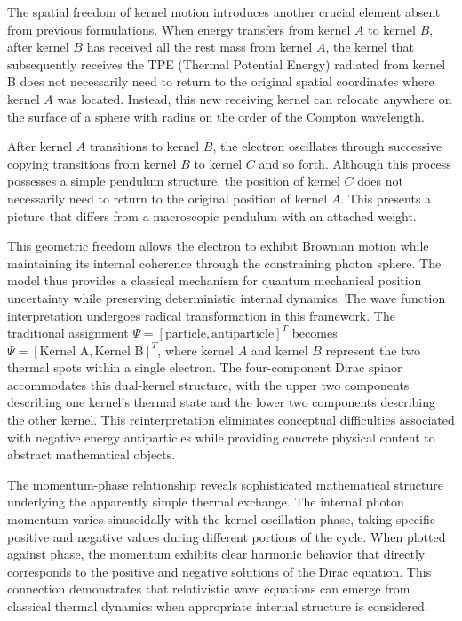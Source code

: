 \documentclass[%
 reprint,
 amsmath,amssymb,
 aps,
]{revtex4-1}
\numberwithin{equation}{section}%
\begin{document}
The spatial freedom of kernel motion introduces another crucial element absent from previous formulations. When energy transfers from kernel $A$ to kernel $B$, after kernel $B$ has received all the rest mass from kernel $A$, the kernel that subsequently receives the TPE (Thermal Potential Energy) radiated from kernel B does not necessarily need to return to the original spatial coordinates where kernel $A$ was located. Instead, this new receiving kernel can relocate anywhere on the surface of a sphere with radius on the order of the Compton wavelength. 

After kernel $A$ transitions to kernel $B$, the electron oscillates through successive copying transitions from kernel $B$ to kernel $C$ and so forth. Although this process possesses a simple pendulum structure, the position of kernel $C$ does not necessarily need to return to the original position of kernel $A$. This presents a picture that differs from a macroscopic pendulum with an attached weight.

This geometric freedom allows the electron to exhibit Brownian motion while maintaining its internal coherence through the constraining photon sphere. The model thus provides a classical mechanism for quantum mechanical position uncertainty while preserving deterministic internal dynamics.
The wave function interpretation undergoes radical transformation in this framework. The traditional assignment $\Psi = [\text{particle}, \text{antiparticle}]^T$ becomes $\Psi = [\text{Kernel A}, \text{Kernel B}]^T$, where kernel $A$ and kernel $B$ represent the two thermal spots within a single electron. The four-component Dirac spinor accommodates this dual-kernel structure, with the upper two components describing one kernel's thermal state and the lower two components describing the other kernel. This reinterpretation eliminates conceptual difficulties associated with negative energy antiparticles while providing concrete physical content to abstract mathematical objects.

The momentum-phase relationship reveals sophisticated mathematical structure underlying the apparently simple thermal exchange. The internal photon momentum varies sinusoidally with the kernel oscillation phase, taking specific positive and negative values during different portions of the cycle. When plotted against phase, the momentum exhibits clear harmonic behavior that directly corresponds to the positive and negative solutions of the Dirac equation. This connection demonstrates that relativistic wave equations can emerge from classical thermal dynamics when appropriate internal structure is considered.
\end{document}
